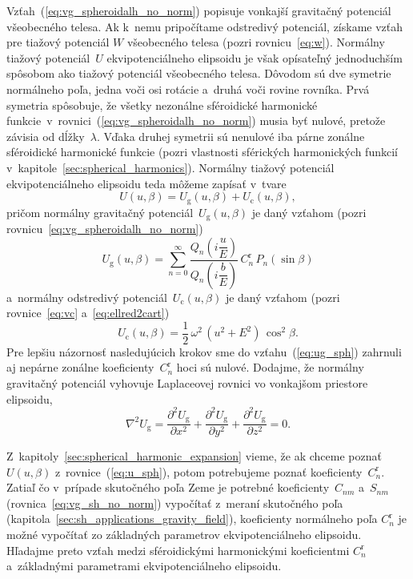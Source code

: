 \documentclass[a4paper, 12pt]{book}
\newcommand{\gidx}{\mathrm g}
\newcommand{\cidx}{\mathrm c}
\begin{document}
Vzťah~(\ref{eq:vg_spheroidalh_no_norm}) popisuje vonkajší gravitačný potenciál 
všeobecného telesa.  Ak k~nemu pripočítame odstredivý potenciál, získame vzťah 
pre tiažový potenciál $W$ všeobecného telesa (pozri rovnicu~\ref{eq:w}).  
Normálny tiažový potenciál~$U$ ekvipotenciálneho elipsoidu je však opísateľný 
jednoduchším spôsobom ako tiažový potenciál všeobecného telesa.  Dôvodom sú dve 
symetrie normálneho poľa, jedna voči osi rotácie a~druhá voči rovine rovníka.  
Prvá symetria spôsobuje, že všetky nezonálne sféroidické harmonické 
funkcie~v~rovnici~(\ref{eq:vg_spheroidalh_no_norm}) musia byť nulové, pretože 
závisia od dĺžky~$\lambda$.  Vďaka druhej symetrii sú nenulové iba párne 
zonálne sféroidické harmonické funkcie (pozri vlastnosti sférických 
harmonických funkcií v~kapitole~\ref{sec:spherical_harmonics}).  Normálny 
tiažový potenciál ekvipotenciálneho elipsoidu teda môžeme zapísať v~tvare
%
\begin{equation}
\label{eq:u_sph}
U(u, \beta) = U_\gidx(u, \beta) + U_\cidx(u, \beta){,}
\end{equation}
%
pričom normálny gravitačný potenciál~$U_\gidx(u, \beta)$ je daný vzťahom (pozri 
rovnicu~\ref{eq:vg_spheroidalh_no_norm})
%
\begin{equation}
\label{eq:ug_sph}
U_\gidx(u, \beta) = \sum_{n = 0}^\infty \frac{Q_n\left( i \dfrac{u}{E} 
\right)}{Q_n\left( i \dfrac{b}{E} \right)} \,  C^{\mathrm{r}}_n \, 
P_n(\sin\beta)
\end{equation}
%
a~normálny odstredivý potenciál~$U_\cidx(u, \beta)$ je daný vzťahom (pozri 
rovnice~\ref{eq:vc} a~\ref{eq:ellred2cart})
%
\begin{equation}
\label{eq:uc_sph}
U_\cidx(u, \beta) = \frac{1}{2} \, \omega^2 \, (u^2 + E^2) \, \cos^2\beta{.}
\end{equation}
%
Pre lepšiu názornosť nasledujúcich krokov sme do vzťahu~(\ref{eq:ug_sph}) 
zahrnuli aj nepárne zonálne koeficienty~$C^{\mathrm{r}}_n$ hoci sú nulové.  
Dodajme, že normálny gravitačný potenciál vyhovuje Laplaceovej rovnici vo 
vonkajšom priestore elipsoidu,
%
\begin{equation}
\label{eq:ug_laplace_cart}
\nabla^2 U_\gidx = \frac{\partial^2 U_\gidx}{\partial x^2} + \frac{\partial^2 
U_\gidx}{\partial y^2} + \frac{\partial^2 U_\gidx}{\partial z^2} = 0{.}
\end{equation}

Z~kapitoly~\ref{sec:spherical_harmonic_expansion} vieme, že ak chceme poznať 
$U(u,\beta)$ z~rovnice~(\ref{eq:u_sph}), potom potrebujeme poznať 
koeficienty~$C_n^\mathrm{r}$.  Zatiaľ čo v~prípade skutočného poľa Zeme je 
potrebné koeficienty~$C_{nm}$ a~$S_{nm}$ (rovnica~\ref{eq:vg_sh_no_norm}) 
vypočítať z~meraní skutočného poľa 
(kapitola~\ref{sec:sh_applications_gravity_field}), koeficienty normálneho poľa 
$C_n^\mathrm{r}$ je možné vypočítať zo základných parametrov ekvipotenciálneho 
elipsoidu.  Hľadajme preto vzťah medzi sféroidickými harmonickými koeficientmi 
$C_n^\mathrm{r}$ a~základnými parametrami ekvipotenciálneho elipsoidu.
\end{document}
